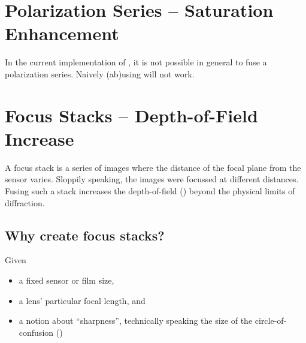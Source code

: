 


\section[Polarization Series -- Saturation Enhancement]{%
  \label{sec:polarization-series--saturation-enhancement}%
  Polarization Series -- Saturation Enhancement}


In the current implementation of \App{}, it is not possible in general to fuse a polarization
series.  Naively (ab)using  will not work.


\section[Focus Stacks -- Depth-of-Field Increase]{%
  \label{sec:focus-stacks--depth-of-field-increase}%
  Focus Stacks -- Depth-of-Field Increase}


%
%
A focus stack is a series of images where the distance of the focal plane from the sensor
varies.  Sloppily speaking, the images were focussed at different distances.  Fusing such a
stack increases the depth-of-field () beyond the physical limits of diffraction.


\subsection[Why create focus stacks?]{\label{sec:why-create-focus-stacks}%
  Why create focus stacks?}

Given

\begin{itemize}
\item
  a fixed sensor or film size,

\item
  a lens' particular focal length, and

\item
  a notion about ``sharpness'', technically speaking the size of the circle-of-confusion
  ()
\end{itemize}

